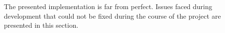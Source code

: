 The presented implementation is far from perfect.
Issues faced during development that could not be fixed during the course of the
project are presented in this section.


